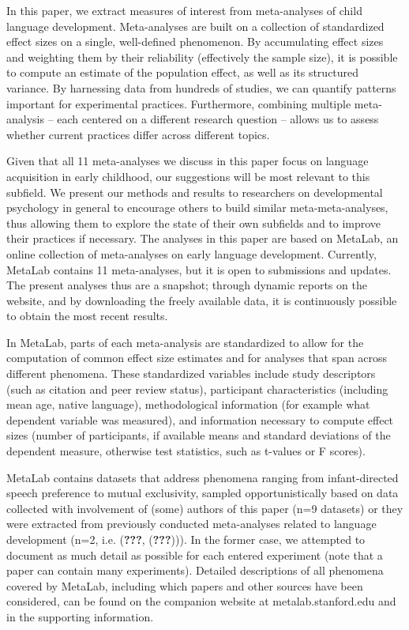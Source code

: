 \documentclass[english,floatsintext,man]{apa6}
\newcounter{author}
\begin{document}
In this paper, we extract measures of interest from meta-analyses of
child language development. Meta-analyses are built on a collection of
standardized effect sizes on a single, well-defined phenomenon. By
accumulating effect sizes and weighting them by their reliability
(effectively the sample size), it is possible to compute an estimate of
the population effect, as well as its structured variance. By harnessing
data from hundreds of studies, we can quantify patterns important for
experimental practices. Furthermore, combining multiple meta-analysis --
each centered on a different research question -- allows us to assess
whether current practices differ across different topics.

Given that all 11 meta-analyses we discuss in this paper focus on
language acquisition in early childhood, our suggestions will be most
relevant to this subfield. We present our methods and results to
researchers on developmental psychology in general to encourage others
to build similar meta-meta-analyses, thus allowing them to explore the
state of their own subfields and to improve their practices if
necessary. The analyses in this paper are based on MetaLab, an online
collection of meta-analyses on early language development. Currently,
MetaLab contains 11 meta-analyses, but it is open to submissions and
updates. The present analyses thus are a snapshot; through dynamic
reports on the website, and by downloading the freely available data, it
is continuously possible to obtain the most recent results.

In MetaLab, parts of each meta-analysis are standardized to allow for
the computation of common effect size estimates and for analyses that
span across different phenomena. These standardized variables include
study descriptors (such as citation and peer review status), participant
characteristics (including mean age, native language), methodological
information (for example what dependent variable was measured), and
information necessary to compute effect sizes (number of participants,
if available means and standard deviations of the dependent measure,
otherwise test statistics, such as t-values or F scores).

MetaLab contains datasets that address phenomena ranging from
infant-directed speech preference to mutual exclusivity, sampled
opportunistically based on data collected with involvement of (some)
authors of this paper (n=9 datasets) or they were extracted from
previously conducted meta-analyses related to language development (n=2,
i.e. ({\textbf{???}}, ({\textbf{???}}))). In the former case, we
attempted to document as much detail as possible for each entered
experiment (note that a paper can contain many experiments). Detailed
descriptions of all phenomena covered by MetaLab, including which papers
and other sources have been considered, can be found on the companion
website at metalab.stanford.edu and in the supporting information.
\end{document}
